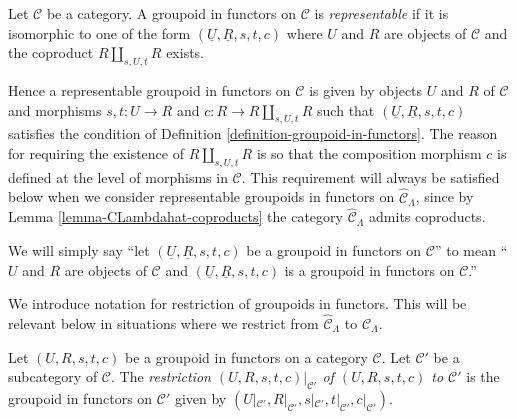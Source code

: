 \begin{definition}
\label{definition-representable}
Let $\mathcal{C}$ be a category.  A groupoid in functors on $\mathcal{C}$ is 
{\it representable} if it is isomorphic to one of the form $(\underline{U}, 
\underline{R}, s,t,c)$ where $U$ and $R$ are objects of $\mathcal{C}$ and the 
coproduct $R \coprod_{s,U,t} R$ exists.
\end{definition}

\begin{remark}
\label{remark-reason-existence-coproduct}
Hence a representable groupoid in functors on $\mathcal{C}$ is given by objects 
$U$ and $R$ of $\mathcal{C}$ and morphisms $s,t: U \to R$ and $c: R 
\to R \coprod_{s,U,t} R$ such that 
$(\underline{U},\underline{R},s,t,c)$ satisfies the condition of Definition 
\ref{definition-groupoid-in-functors}. The reason for requiring the existence 
of $R \coprod_{s,U,t} R$ is so that the composition morphism $c$ is defined at 
the level of morphisms in $\mathcal{C}$.  This requirement will always be 
satisfied below when we consider representable groupoids in functors on 
$\widehat{\mathcal{C}}_\Lambda$, since by Lemma 
\ref{lemma-CLambdahat-coproducts} the category $\widehat{\mathcal{C}}_\Lambda$ 
admits coproducts.
\end{remark}

\begin{remark}
\label{remark-simplify-terminology}
We will simply say ``let $(\underline{U}, \underline{R}, s,t,c)$ be a groupoid 
in functors on $\mathcal{C}$'' to mean ``$U$ and $R$ are objects of $\mathcal{C}$ 
and $(\underline{U}, \underline{R}, s,t,c)$ is a groupoid in functors on 
$\mathcal{C}$.''
\end{remark}

\noindent
We introduce notation for restriction of groupoids in functors. This will be 
relevant below in situations where we restrict from $\widehat{\mathcal 
C}_\Lambda$ to $\mathcal{C}_\Lambda$.

\begin{definition}
\label{definition-restricting-groupoids-in-functors}
Let $(U,R,s,t,c)$ be a groupoid in functors on a category $\mathcal{C}$.  Let 
$\mathcal{C}'$ be a subcategory of $\mathcal{C}$.  The {\it restriction 
$(U,R,s,t,c)|_{\mathcal{C}'}$ of $(U,R,s,t,c)$ to $\mathcal{C}'$} is the groupoid 
in functors on $\mathcal{C}'$ given by $(U|_{\mathcal{C}'},R|_{\mathcal 
C'},s|_{\mathcal{C}'},t|_{\mathcal{C}'},c|_{\mathcal{C}'})$.
\end{definition}

